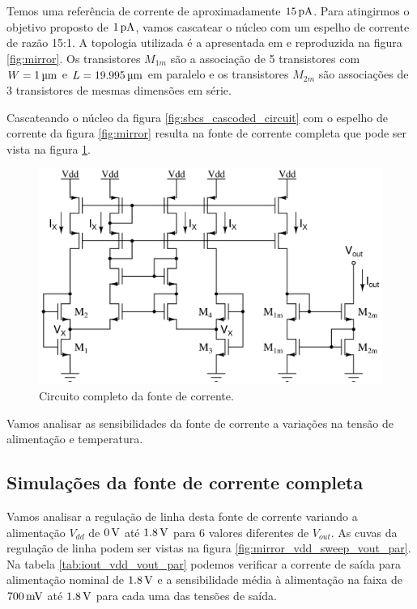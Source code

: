\documentclass[10pt,a4paper]{extreport}
\newcommand{\?}{\stackrel{?}{=}}
\newcommand{\sis}[2]{\complexnum{#1}\,\si[per-mode=symbol]{#2}}
\newcommand{\mysize}{0.69}
\begin{document}
Temos uma referência de corrente de aproximadamente $\sis{15}{\pico\ampere}$. Para atingirmos o objetivo proposto de $\sis{1}{\pico\ampere}$, vamos cascatear o núcleo com um espelho de corrente de razão 15:1. A topologia utilizada é a apresentada em \cite{wilson} e reproduzida na figura \ref{fig:mirror}. Os transistores $M_{1m}$ são a associação de 5 transistores com $W=\sis{1}{\micro\meter}$ e $L=\sis{19.995}{\micro\meter}$ em paralelo e os transistores $M_{2m}$ são associações de 3 transistores de mesmas dimensões em série.

Cascateando o núcleo da figura \ref{fig:sbcs_cascoded_circuit} com o espelho de corrente da figura \ref{fig:mirror} resulta na fonte de corrente completa que pode ser vista na figura \ref{fig:full_sbcs}.

\begin{figure}[htp!]
    \includegraphics[width=\mysize\linewidth]{Imagens/full_sbcs.jpg}
    \centering
    \caption{Circuito completo da fonte de corrente.}
    \label{fig:full_sbcs}
\end{figure}

Vamos analisar as sensibilidades da fonte de corrente a variações na tensão de alimentação e temperatura.

\subsection{Simulações da fonte de corrente completa}

Vamos analisar a regulação de linha desta fonte de corrente variando a alimentação $V_{dd}$ de $\sis{0}{\volt}$ até $\sis{1.8}{\volt}$ para 6 valores diferentes de $V_{out}$. As cuvas da regulação de linha podem ser vistas na figura \ref{fig:mirror_vdd_sweep_vout_par}. Na tabela \ref{tab:iout_vdd_vout_par} podemos verificar a corrente de saída para alimentação nominal de $\sis{1.8}{\volt}$ e a sensibilidade média à alimentação na faixa de $\sis{700}{\milli\volt}$ até $\sis{1.8}{\volt}$ para cada uma das tensões de saída.
\end{document}
